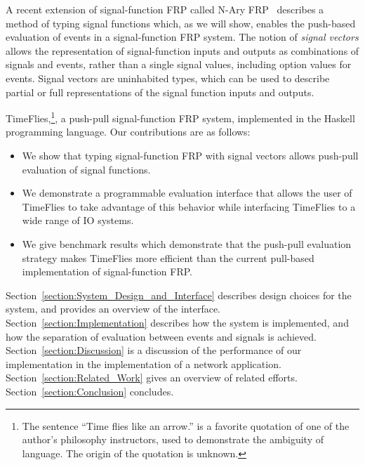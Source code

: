 A recent extension of signal-function FRP called N-Ary FRP~\cite{Sculthorpe2011}
describes a method of typing signal functions which, as we will show, enables
the push-based evaluation of events in a signal-function FRP system. The notion
of {\em signal vectors} allows the  representation of signal-function inputs and
outputs as combinations of signals and events, rather than a single
signal  values, including option values for events. Signal vectors
are uninhabited types, which can be used to describe partial or full
representations of the signal function inputs and outputs.

TimeFlies,\footnote{The sentence ``Time flies like an arrow.'' is a 
favorite quotation of one of the author's philosophy instructors, used to
demonstrate the ambiguity of language. The origin of the quotation is unknown.},
a push-pull signal-function FRP system, implemented in the Haskell
programming language. Our contributions are as follows:

\begin{itemize}
  \item We show that typing signal-function FRP with signal vectors allows
        push-pull evaluation of signal functions. 
  \item We demonstrate a programmable evaluation interface that allows the user
        of TimeFlies to take advantage of this behavior while interfacing
        TimeFlies to a wide range of IO systems.
  \item We give benchmark results which demonstrate that the push-pull
        evaluation strategy makes TimeFlies more efficient than the current
        pull-based implementation of signal-function FRP.
\end{itemize}

Section~\ref{section:System_Design_and_Interface} describes design choices for
the system, and provides an overview of the interface.
Section~\ref{section:Implementation} describes how the system is implemented,
and how the separation of evaluation between events and signals is achieved.
Section~\ref{section:Discussion} is a discussion of the performance of our
implementation in the implementation of a network application. Section~\ref{section:Related_Work} gives an overview of
related efforts. Section~\ref{section:Conclusion} concludes.

